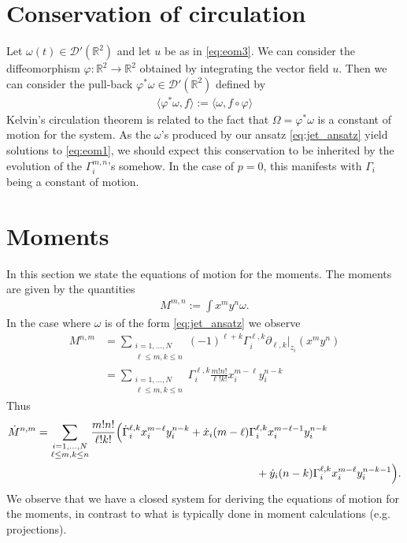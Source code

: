 \documentclass[12pt]{amsart}
\newcommand{\R}{\ensuremath{\mathbb{R}}}
\begin{document}
\section{Conservation of circulation}
\label{sec:circulation}
Let $\omega(t) \in \mathcal{D}'(\R^2)$ and let $u$ be as in \eqref{eq:eom3}.
We can consider the diffeomorphism $\varphi: \mathbb{R}^2 \to \mathbb{R}^2$
obtained by integrating the vector field $u$.
Then we can consider the pull-back $\varphi^*\omega \in \mathcal{D}'(\mathbb{R}^2)$ defined by
\begin{align*}
  \langle \varphi^* \omega , f \rangle := \langle \omega , f \circ \varphi \rangle
\end{align*}
Kelvin's circulation theorem is related to the fact that $\Omega =\varphi^* \omega$ is a constant of motion for the system.
As the $\omega$'s produced by our ansatz \eqref{eq:jet_ansatz} yield solutions to \eqref{eq:eom1}, we should expect this conservation to be inherited by the evolution of the $\Gamma^{m,n}_i$'s somehow.  In the case of $p=0$, this manifests with $\Gamma_i$ being a constant of motion.


\section{Moments}
\label{sec:moments}
In this section we state the equations of motion for the moments.
The moments are given by the quantities
\begin{align*}
	M^{m,n} := \int x^m y^n  \omega .
\end{align*}
In the case where $\omega$ is of the form \eqref{eq:jet_ansatz} we observe
\begin{align*}
	M^{n,m} &=  \sum_{
		\substack{
			i=1,\dots,N\\
			\ell \leq m,k \leq n}
				}
				(-1)^{\ell + k} \Gamma_i^{\ell,k} \partial_{\ell,k}|_{z_i}(x^m y^n) \\
		&= \sum_{
		\substack{
			i=1,\dots,N\\
			\ell \leq m,k \leq n}
				}
				\Gamma_i^{\ell,k}  \frac{m! n!}{\ell! k!} x_i^{m-\ell} y_i^{n-k} 
\end{align*}
Thus
\begin{align*}
	\dot{M}^{n,m} &=  \sum_{
		\substack{
			i=1,\dots,N\\
			\ell \leq m,k \leq n}
				}
				\frac{m! n!}{\ell! k!} \Big( \dot{\Gamma}_i^{\ell,k}  x_i^{m-\ell} y_i^{n-k} 
				+  \dot{x}_i (m-\ell) \Gamma_i^{\ell,k} x_i^{m-\ell-1} y_i^{n-k}  \\
				&\hskip 20em +  \dot{y}_i (n-k) \Gamma_i^{\ell,k} x_i^{m-\ell} y_i^{n-k-1}  \Big).
\end{align*}
We observe that we have a closed system for deriving the equations of motion for the moments,
in contrast to what is typically done in moment calculations (e.g. projections).
\end{document}
